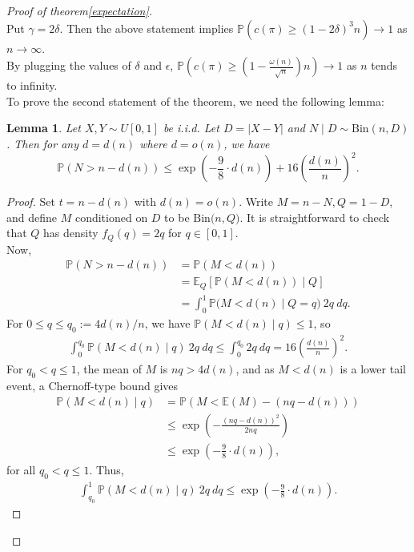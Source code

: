 \documentclass[11pt, a4paper]{article}
\theoremstyle{compact}
\newtheorem{lemma}[theorem]{Lemma}
\begin{document}
\begin{proof}[Proof of theorem\ref{expectation}]
\[ \]
 Put $\gamma = 2 \delta$. Then the above statement implies $ \mathbb{P}\left(c(\pi) \geq (1 - 2 \delta)^3 n \right) \longrightarrow 1$ as $ n \rightarrow \infty$. \\
 By plugging the values of $\delta$ and $ \epsilon $, $\mathbb{P}\left( c(\pi) \geq \left( 1- \frac{\omega(n)}{\sqrt{n}} \right)n \right) \longrightarrow 1 $ as $n$ tends to infinity. \\
 To prove the second statement of the theorem, we need the following lemma:
\begin{lemma}\label{lemma 4.2}
   Let \(X,Y\sim U[0,1]\) be i.i.d. Let \(D = |X-Y|\) and \(N\mid D \sim \text{Bin}(n,D)\). Then for any $d = d(n)$ where $d=o(n)$, we have
   $$ \mathbb{P}(N>n-d(n)) \leq \exp{\left(-\frac{9}{8}\cdot d(n)\right)} + 16\left(\frac{d(n)}{n}\right)^2.$$
\end{lemma}
\begin{proof}
Set $t = n - d(n)$ with $d(n) = o(n)$. Write $M = n-N, Q= 1-D$, and define $M$ conditioned on $D$ to be  $\text{Bin}\big(n,Q\big)$. It is straightforward to check that $Q$ has  density $f_Q(q) = 2q$ for $q \in [0, 1]$.\\
Now,
\begin{align*}
    \mathbb{P}(N>n-d(n)) & = \mathbb{P}\left( M < d(n) \right) \\
   &= \mathbb{E}_Q\left[ \mathbb{P}(M<d(n) ) \mid Q\right] \\
   & = \int_0^1 \mathbb{P}\big(M<d(n)\mid Q=q\big)\ 2q\ dq.
\end{align*}
 For $0\le q\le q_0:=4d(n)/n$, we have $\mathbb{P}(M<d(n)\mid q)\le 1$, so
    \begin{align}\label{eq:9}
        \int_0^{q_0} \mathbb{P}(M<d(n)\mid q)\ 2q\  dq
    \le \int_0^{q_0} 2q\ dq
    = 16\left(\frac{d(n)}{n}\right)^2.
    \end{align}
    For $q_0 < q \leq 1$, the mean of $M$ is $nq > 4d(n)$, and as $M<d(n)$ is a lower tail event, a Chernoff-type bound gives 
    \begin{align*}
         \mathbb{P}(M<d(n)\mid q) & = \mathbb{P}\left(  M < \mathbb{E}(M)  -(nq - d(n))\right) \\
        & \leq \exp{\left( -\frac{(nq - d(n))^2}{2nq} \right)} \\
       & \leq \exp{\left( -\frac{9}{8}\cdot d(n) \right)},
    \end{align*}
    for all $q_0 < q \leq 1$. Thus,
    \begin{align}
        \int_{q_0}^1 \mathbb{P}(M<d(n)\mid q)\ 2q\  dq \le \exp\left(-\frac{9}{8}\cdot d(n)\right).

\end{align}
\end{proof}
\end{proof}
\end{document}

